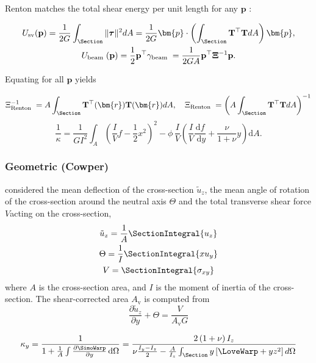 Renton matches the total shear energy per unit length for any $\bm{p}$ :

$$
\begin{gathered}
U_{\mathrm{sv}}(\mathbf{p})=\frac{1}{2 G} \int_{\Section}\|\boldsymbol{\tau}\|^2 d A=\frac{1}{2 G} \bm{p}\cdot\left(\int_{\Section} \mathbf{T}^{\top} \mathbf{T} d A\right) \bm{p}, \\
U_{\text {beam }}(\mathbf{p})=\frac{1}{2} \mathbf{p}^{\top} \gamma_{\text {beam }}=\frac{1}{2 G A} \mathbf{p}^{\top} \mathbf{\Xi}^{-1} \mathbf{p} .
\end{gathered}
$$

Equating for all $\mathbf{p}$ yields

$$
\Xi_{\text {Renton }}^{-1}=A \int_{\Section} \mathbf{T}^{\top}(\bm{r}) \mathbf{T}(\bm{r}) d A, \quad \Xi_{\text {Renton }}=\left(A \int_{\Section} \mathbf{T}^{\top} \mathbf{T} d A\right)^{-1}
$$
\begin{equation}
\frac{1}{\kappa}=\frac{1}{G I^2} \int_A\left(\frac{I}{V}f-\frac{1}{2} x^2\right)^2-\phi\, \frac{I}{V}\left(\frac{I}{V}\frac{\mathrm{d} f}{\mathrm{~d} y}+\frac{\nu}{1+\nu}y\right) \mathrm{d} A .
\end{equation}

\subsubsection{Geometric (Cowper)}
\cite{cowper1966shear} considered the mean deflection of the cross-section \(\tilde{u}_z\), the mean angle of rotation of the cross-section around the neutral axis $\Theta$ and the total transverse shear force \(V\)acting on the cross-section,
$$
\begin{gathered}
\tilde{u}_z=\frac{1}{A} \SectionIntegral{ u_z } \\
\Theta = \frac{1}{I} \SectionIntegral{ x u_y } \\
V=\SectionIntegral{ \sigma_{x y} }
\end{gathered}
$$
where \(A\) is the cross-section area, and \(I\) is the moment of inertia of the cross-section. The shear-corrected area $A_{\mathrm{v}}$ is computed from
$$
\frac{\partial \tilde{u}_z}{\partial y}+\Theta = \frac{V}{A_{\mathrm{v}} G}
$$

\begin{equation}
\kappa_y=\frac{1}{1+\frac{1}{A} \int \frac{\partial \SimoWarp}{\partial y} \, \mathrm{d} \Omega}
=\frac{2\left(1+\nu\right) I_z}{\nu \frac{I_y-I_z}{2}-\frac{A}{I_z} \int_{\Section} y\left[\LoveWarp+y z^2\right] d \Omega}
\end{equation}

